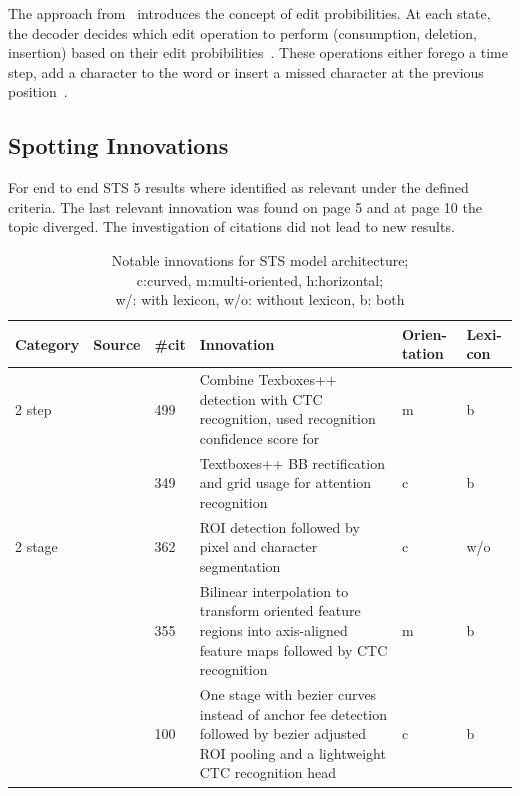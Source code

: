 The approach from~\cite{bai_edit_2018} introduces the concept of edit probibilities.
At each state, the decoder decides which edit operation to perform (consumption, deletion, insertion)
based on their edit probibilities~\citep{bai_edit_2018}.
These operations either forego a time step, add a character to the word or insert a missed character
at the previous position~\citep{bai_edit_2018}.

\subsection{Spotting Innovations}
For end to end \ac{STS} 5 results where identified as relevant under the defined criteria.
The last relevant innovation was found on page 5 and at page 10 the topic diverged.
The investigation of citations did not lead to new results.
\begin{table}[h]
    \centering\scriptsize
    \begin{tabular}{p{}p{}p{}p{}
            p{}p{}}
    \textbf{Category} & \textbf{Source} & \textbf{\#cit} & \textbf{Innovation} &
                                        \textbf{Orien-tation} & \textbf{Lexi-con} \\
        \toprule
        2 step &~\cite{liao_textboxes_2018} & 499 & Combine Texboxes++ detection with \ac{CTC}
            recognition, used recognition confidence score for & m & b\\
            &~\cite{shi_aster_2019} & 349 & Textboxes++ \ac{BB} rectification and grid usage for
                attention recognition & c & b \\
        2 stage &~\cite{lyu_mask_2018} & 362 & \ac{ROI} detection followed by pixel and character
            segmentation & c & w/o \\
            &~\cite{liu_fots_2018} & 355 & Bilinear interpolation to transform oriented feature
                regions into axis-aligned feature maps followed by \ac{CTC} recognition
                & m & b \\
            &~\cite{liu_abcnet_2020} & 100 & One stage with bezier curves instead of anchor fee
                detection followed by bezier adjusted ROI pooling and a lightweight \ac{CTC}
                recognition head & c & b  \\
        \bottomrule
    \end{tabular}
    \captionsetup{justification=centering}
    \caption[Notable innovations for STS model architecture]{%
        Notable innovations for STS model architecture; \\
        c:curved, m:multi-oriented, h:horizontal; \\
        w/: with lexicon, w/o: without lexicon, b: both\label{tb:E2E-steps-properties}
    }
\end{table}

